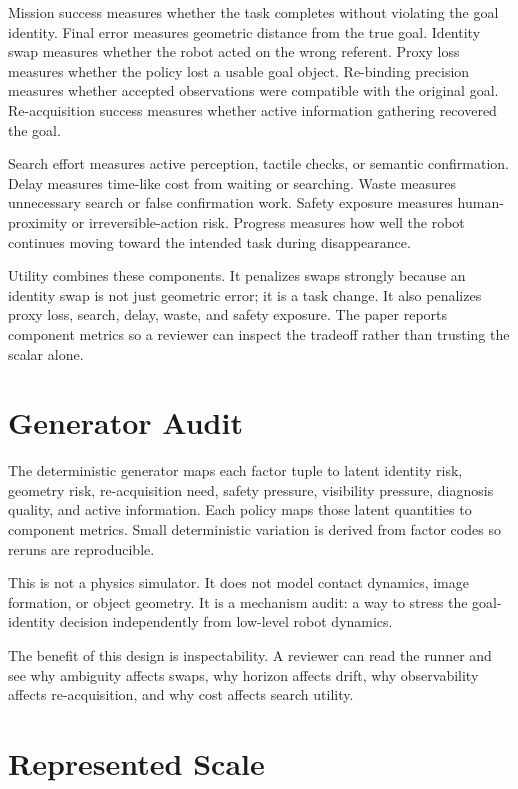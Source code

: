 Mission success measures whether the task completes without violating the goal identity. Final error measures geometric distance from the true goal. Identity swap measures whether the robot acted on the wrong referent. Proxy loss measures whether the policy lost a usable goal object. Re-binding precision measures whether accepted observations were compatible with the original goal. Re-acquisition success measures whether active information gathering recovered the goal.

Search effort measures active perception, tactile checks, or semantic confirmation. Delay measures time-like cost from waiting or searching. Waste measures unnecessary search or false confirmation work. Safety exposure measures human-proximity or irreversible-action risk. Progress measures how well the robot continues moving toward the intended task during disappearance.

Utility combines these components. It penalizes swaps strongly because an identity swap is not just geometric error; it is a task change. It also penalizes proxy loss, search, delay, waste, and safety exposure. The paper reports component metrics so a reviewer can inspect the tradeoff rather than trusting the scalar alone.

\section{Generator Audit}

The deterministic generator maps each factor tuple to latent identity risk, geometry risk, re-acquisition need, safety pressure, visibility pressure, diagnosis quality, and active information. Each policy maps those latent quantities to component metrics. Small deterministic variation is derived from factor codes so reruns are reproducible.

This is not a physics simulator. It does not model contact dynamics, image formation, or object geometry. It is a mechanism audit: a way to stress the goal-identity decision independently from low-level robot dynamics.

The benefit of this design is inspectability. A reviewer can read the runner and see why ambiguity affects swaps, why horizon affects drift, why observability affects re-acquisition, and why cost affects search utility.

\section{Represented Scale}

